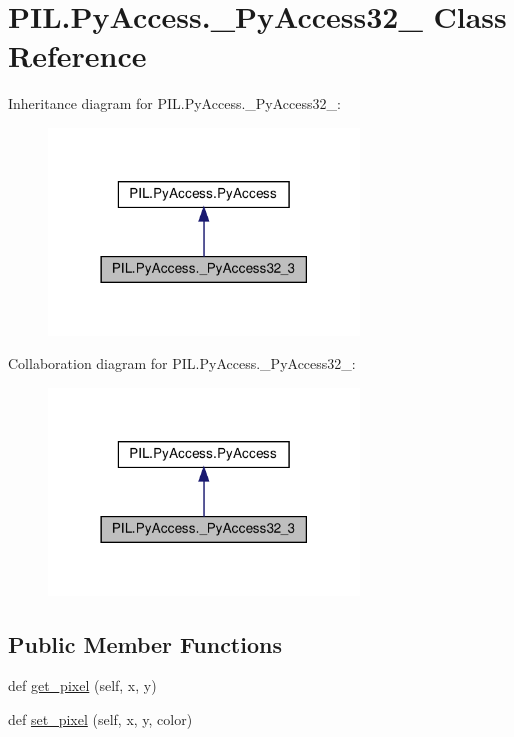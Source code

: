 \hypertarget{classPIL_1_1PyAccess_1_1__PyAccess32__3}{}\section{P\+I\+L.\+Py\+Access.\+\_\+\+Py\+Access32\+\_ Class Reference}
\label{classPIL_1_1PyAccess_1_1__PyAccess32__3}


Inheritance diagram for P\+I\+L.\+Py\+Access.\+\_\+\+Py\+Access32\+\_\+:
\nopagebreak
\begin{figure}[H]
\begin{center}
\leavevmode
\includegraphics[width=234pt]{classPIL_1_1PyAccess_1_1__PyAccess32__3__inherit__graph}
\end{center}
\end{figure}


Collaboration diagram for P\+I\+L.\+Py\+Access.\+\_\+\+Py\+Access32\+\_\+:
\nopagebreak
\begin{figure}[H]
\begin{center}
\leavevmode
\includegraphics[width=234pt]{classPIL_1_1PyAccess_1_1__PyAccess32__3__coll__graph}
\end{center}
\end{figure}
\subsection*{Public Member Functions}
\begin{DoxyCompactItemize}
\item 
def \hyperlink{classPIL_1_1PyAccess_1_1__PyAccess32__3_ab5d22fd5830c327ae08f8a8b7c58365d}{get\+\_\+pixel} (self, x, y)
\item 
def \hyperlink{classPIL_1_1PyAccess_1_1__PyAccess32__3_add51ed67f126d526af6a6b32528dceda}{set\+\_\+pixel} (self, x, y, color)
\end{DoxyCompactItemize}
